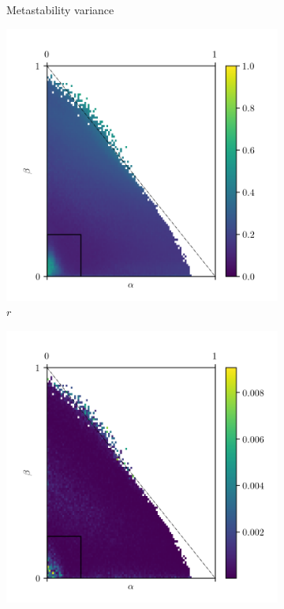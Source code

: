 \begin{figure}[ht!]
\begin{subfigure}{0.3\textwidth}
    \caption{Metastability variance}
    \label{fig:meta_var}
  \end{subfigure}%
  \begin{subfigure}{0.3\textwidth}
    \centering
    \includegraphics[width=\textwidth]{figure/r}
    \caption{$r$}
    \label{fig:r}
  \end{subfigure}%
  \begin{subfigure}{0.3\textwidth}
    \centering
    \includegraphics[width=\textwidth]{figure/r_var}

\end{subfigure}
\end{figure}
